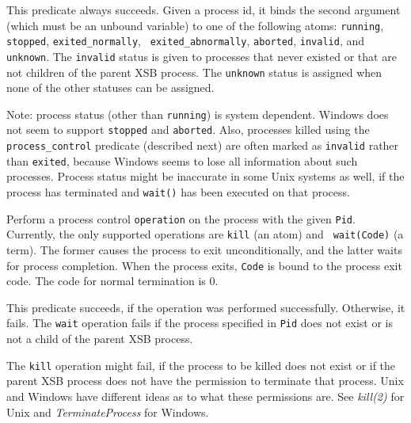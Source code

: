 \begin{description}
  This predicate always succeeds. Given a process id, it binds the second
  argument (which must be an unbound variable) to one of the following
  atoms: {\tt running}, {\tt stopped}, {\tt exited\_normally}, {\tt
    exited\_abnormally}, {\tt aborted}, {\tt invalid}, and {\tt unknown}.
  The {\tt invalid} status is given to processes that never existed or that
  are not children of the parent XSB process. The {\tt unknown} status is
  assigned when none of the other statuses can be assigned.
  
  Note: process status (other than {\tt running}) is system dependent.
  Windows does not seem to support {\tt stopped} and {\tt aborted}.  Also,
  processes killed using the \verb|process_control| predicate (described
  next) are often marked as {\tt invalid} rather than {\tt exited}, because
  Windows seems to lose all information about such processes. Process
  status might be inaccurate in some Unix systems as well, if the process
  has terminated and {\tt wait()} has been executed on that process.

    Perform a process control {\tt operation} on the process with the given
    {\tt Pid}. 
    Currently, the only supported operations are {\tt kill} (an atom) and {\tt
    wait(Code)} (a term).
    The former causes the process to exit unconditionally, and the latter
    waits for process completion. When the process exits, {\tt Code} is
    bound to the process exit code. The code for normal termination is 0.

    This predicate succeeds, if the operation was performed successfully.
    Otherwise, it fails. The {\tt wait} operation fails if the process
    specified in {\tt Pid} does not exist or is not a child of the parent
    XSB process. 
    
    The {\tt kill} operation might fail, if the process to be killed does
    not exist or if the parent XSB process does not have the permission to
    terminate that process. Unix and Windows have different ideas as to
    what these permissions are. See \emph{kill(2)} for Unix and
    \emph{TerminateProcess} for Windows.
    

\end{description}
